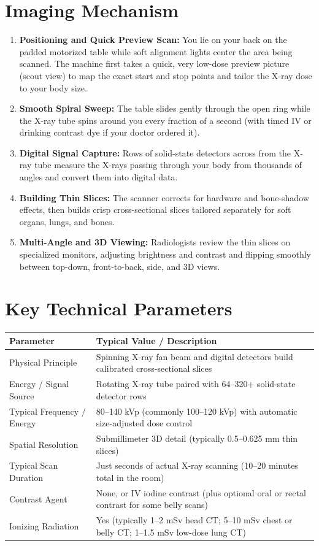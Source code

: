 \section{Imaging Mechanism}
\begin{enumerate}
    \item \textbf{Positioning and Quick Preview Scan:} You lie on your back on the padded motorized table while soft alignment lights center the area being scanned. The machine first takes a quick, very low-dose preview picture (scout view) to map the exact start and stop points and tailor the X-ray dose to your body size.
    \item \textbf{Smooth Spiral Sweep:} The table slides gently through the open ring while the X-ray tube spins around you every fraction of a second (with timed IV or drinking contrast dye if your doctor ordered it).
    \item \textbf{Digital Signal Capture:} Rows of solid-state detectors across from the X-ray tube measure the X-rays passing through your body from thousands of angles and convert them into digital data.
    \item \textbf{Building Thin Slices:} The scanner corrects for hardware and bone-shadow effects, then builds crisp cross-sectional slices tailored separately for soft organs, lungs, and bones.
    \item \textbf{Multi-Angle and 3D Viewing:} Radiologists review the thin slices on specialized monitors, adjusting brightness and contrast and flipping smoothly between top-down, front-to-back, side, and 3D views.
\end{enumerate}

\section{Key Technical Parameters}
\noindent
\begin{tabularx}{\textwidth}{@{}l X@{}}
\toprule
\textbf{Parameter} & \textbf{Typical Value / Description} \\
\midrule
Physical Principle & Spinning X-ray fan beam and digital detectors build calibrated cross-sectional slices \\
Energy / Signal Source & Rotating X-ray tube paired with 64--320+ solid-state detector rows \\
Typical Frequency / Energy & 80--140 kVp (commonly 100--120 kVp) with automatic size-adjusted dose control \\
Spatial Resolution & Submillimeter 3D detail (typically 0.5--0.625 mm thin slices) \\
Typical Scan Duration & Just seconds of actual X-ray scanning (10--20 minutes total in the room) \\
Contrast Agent & None, or IV iodine contrast (plus optional oral or rectal contrast for some belly scans) \\
Ionizing Radiation & Yes (typically 1--2 mSv head CT; 5--10 mSv chest or belly CT; 1--1.5 mSv low-dose lung CT) \\
\bottomrule
\end{tabularx}

